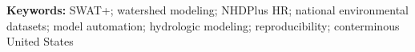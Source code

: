 \noindent\textbf{Keywords:} SWAT+; watershed modeling; NHDPlus HR; national environmental datasets; model automation; hydrologic modeling; reproducibility; conterminous United States
